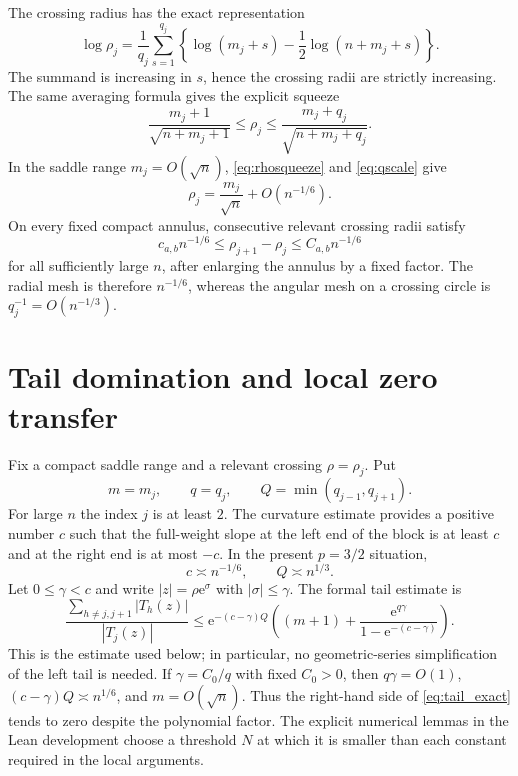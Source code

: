 \documentclass[11pt,reqno]{amsart}
\numberwithin{equation}{section}
\theoremstyle{remark}
\newcommand{\ee}{\mathrm e}
\begin{document}
The crossing radius has the exact representation
\begin{equation}\label{eq:rhoexact}
 \log\rho_j=\frac1{q_j}\sum_{s=1}^{q_j}
 \left\{\log(m_j+s)-\frac12\log(n+m_j+s)\right\}.
\end{equation}
The summand is increasing in $s$, hence the crossing radii are strictly increasing.  The same averaging formula gives the explicit squeeze
\begin{equation}\label{eq:rhosqueeze}
 \frac{m_j+1}{\sqrt{n+m_j+1}}\le \rho_j\le\frac{m_j+q_j}{\sqrt{n+m_j+q_j}}.
\end{equation}
In the saddle range $m_j=O(\sqrt n)$, \eqref{eq:rhosqueeze} and \eqref{eq:qscale} give
\begin{equation}\label{eq:rhoapprox}
 \rho_j=\frac{m_j}{\sqrt n}+O(n^{-1/6}).
\end{equation}
On every fixed compact annulus, consecutive relevant crossing radii satisfy
\begin{equation}\label{eq:rhospace}
 c_{a,b}n^{-1/6}\le \rho_{j+1}-\rho_j\le C_{a,b}n^{-1/6}
\end{equation}
for all sufficiently large $n$, after enlarging the annulus by a fixed factor.  The radial mesh is therefore $n^{-1/6}$, whereas the angular mesh on a crossing circle is $q_j^{-1}=O(n^{-1/3})$.

\section{Tail domination and local zero transfer}\label{sec:local}

Fix a compact saddle range and a relevant crossing $\rho=\rho_j$.  Put
\[
 m=m_j,\qquad q=q_j,\qquad Q=\min(q_{j-1},q_{j+1}).
\]
For large $n$ the index $j$ is at least $2$.  The curvature estimate provides a positive number $c$ such that the full-weight slope at the left end of the block is at least $c$ and at the right end is at most $-c$.  In the present $p=3/2$ situation,
\begin{equation}\label{eq:cscale}
 c\asymp n^{-1/6},\qquad Q\asymp n^{1/3}.
\end{equation}
Let $0\le\gamma<c$ and write $|z|=\rho\ee^\sigma$ with $|\sigma|\le\gamma$.  The formal tail estimate is
\begin{equation}\label{eq:tail_exact}
 \frac{\displaystyle\sum_{h\ne j,j+1}|T_h(z)|}{|T_j(z)|}
 \le
 \ee^{-(c-\gamma)Q}
 \left((m+1)+\frac{\ee^{q\gamma}}{1-\ee^{-(c-\gamma)}}\right).
\end{equation}
This is the estimate used below; in particular, no geometric-series simplification of the left tail is needed.  If $\gamma=C_0/q$ with fixed $C_0>0$, then $q\gamma=O(1)$, $(c-\gamma)Q\asymp n^{1/6}$, and $m=O(\sqrt n)$.  Thus the right-hand side of \eqref{eq:tail_exact} tends to zero despite the polynomial factor.  The explicit numerical lemmas in the Lean development choose a threshold $N$ at which it is smaller than each constant required in the local arguments.
\end{document}
